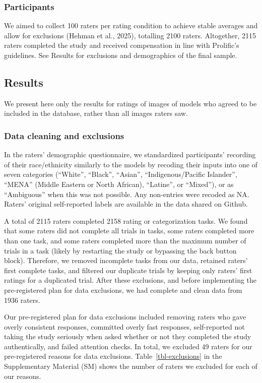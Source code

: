 \documentclass[
  letterpaper,
  DIV=11,
  numbers=noendperiod]{scrartcl}
\begin{document}
\subsubsection{Participants}\label{participants}

We aimed to collect 100 raters per rating condition to achieve stable
averages and allow for exclusions (Hehman et al., 2025), totalling 2100
raters. Altogether, 2115 raters completed the study and received
compensation in line with Prolific's guidelines. See Results for
exclusions and demographics of the final sample.

\subsection{Results}\label{results-1}

We present here only the results for ratings of images of models who
agreed to be included in the database, rather than all images raters
saw.

\subsubsection{Data cleaning and
exclusions}\label{data-cleaning-and-exclusions}

In the raters' demographic questionnaire, we standardized participants'
recording of their race/ethnicity similarly to the models by recoding
their inputs into one of seven categories (``White'', ``Black'',
``Asian'', ``Indigenous/Pacific Islander'', ``MENA'' (Middle Eastern or
North African), ``Latine'', or ``Mixed''), or as ``Ambiguous'' when this
was not possible. Any non-entries were recoded as NA. Raters' original
self-reported labels are available in the data shared on Github.

A total of 2115 raters completed 2158 rating or categorization tasks. We
found that some raters did not complete all trials in tasks, some raters
completed more than one task, and some raters completed more than the
maximum number of trials in a task (likely by restarting the study or
bypassing the back button block). Therefore, we removed incomplete tasks
from our data, retained raters' first complete tasks, and filtered our
duplicate trials by keeping only raters' first ratings for a duplicated
trial. After these exclusions, and before implementing the
pre-registered plan for data exclusions, we had complete and clean data
from 1936 raters.

Our pre-registered plan for data exclusions included removing raters who
gave overly consistent responses, committed overly fast responses,
self-reported not taking the study seriously when asked whether or not
they completed the study authentically, and failed attention checks. In
total, we excluded 49 raters for our pre-registered reasons for data
exclusions. Table~\ref{tbl-exclusions} in the Supplementary Material
(SM) shows the number of raters we excluded for each of our reasons.
\end{document}
